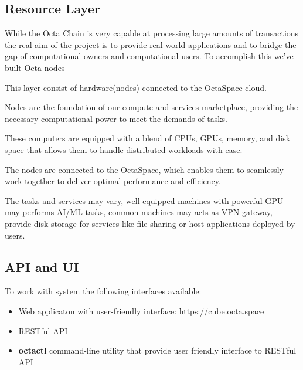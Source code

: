 \subsection{Resource Layer}
While the Octa Chain is very capable at processing large amounts of transactions the real aim of the project is to provide real world applications and to bridge the gap of computational owners and computational users. To accomplish this we’ve built Octa nodes

This layer consist of hardware(nodes) connected to the OctaSpace cloud.

Nodes are the foundation of our compute and services marketplace, providing the necessary computational power to meet the demands of tasks.

These computers are equipped with a blend of CPUs, GPUs, memory, and disk space that allows them to handle distributed workloads with ease.

The nodes are connected to the OctaSpace, which enables them to seamlessly work together to deliver optimal performance and efficiency.

The tasks and services may vary, well equipped machines with powerful GPU may performs AI/ML tasks,
common machines may acts as VPN gateway, provide disk storage for services like file sharing or host applications deployed by users.

\subsection{API and UI}

To work with system the following interfaces available:

\begin{itemize}
    \item Web applicaton with user-friendly interface: \url{https://cube.octa.space}
    \item RESTful API
    \item \textbf{octactl} command-line utility that provide user friendly interface to RESTful API
\end{itemize}
